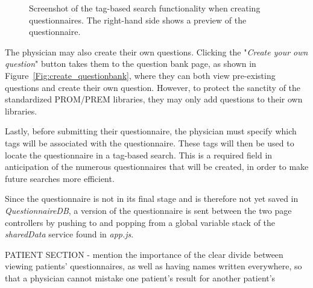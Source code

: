 \documentclass{higrep}
\newcommand{\figureref}[1]{Figure~\ref{#1}}
\begin{document}
\begin{figure}[htbp]
  \centering
  \caption{Screenshot of the tag-based search functionality when creating questionnaires. The right-hand side shows a preview of the questionnaire.} \label{Fig:create_tags}
\end{figure}

The physician may also create their own questions. Clicking the "\textit{Create your own question}" button takes them to the question bank page, as shown in \figureref{Fig:create_questionbank}, where they can both view pre-existing questions and create their own question. However, to protect the sanctity of the standardized PROM/PREM libraries, they may only add questions to their own libraries.

Lastly, before submitting their questionnaire, the physician must specify which tags will be associated with the questionnaire. These tags will then be used to locate the questionnaire in a tag-based search. This is a required field in anticipation of the numerous questionnaires that will be created, in order to make future searches more efficient.

Since the questionnaire is not in its final stage and is therefore not yet saved in \textit{QuestionnaireDB}, a version of the questionnaire is sent between the two page controllers by pushing to and popping from a global variable stack of the \textit{sharedData} service found in \textit{app.js}.



PATIENT SECTION - mention the importance of the clear divide between viewing patients' questionnaires, as well as having names written everywhere, so that a physician cannot mistake one patient's result for another patient's
\end{document}

